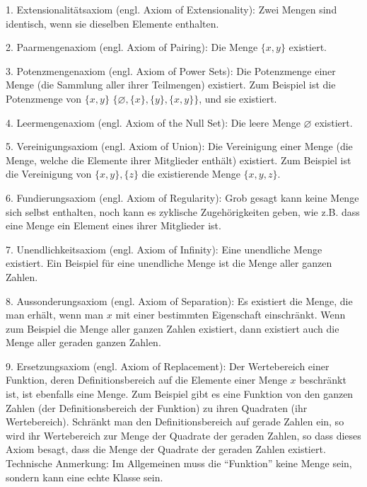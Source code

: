 1. Extensionalitätsaxiom (engl. Axiom of Extensionality):  Zwei Mengen sind identisch, wenn sie dieselben Elemente enthalten.

2. Paarmengenaxiom (engl. Axiom of Pairing):  Die Menge $\{ x , y \}$ existiert.

3. Potenzmengenaxiom (engl. Axiom of Power Sets):  Die Potenzmenge einer Menge (die Sammlung aller ihrer Teilmengen) existiert.  Zum Beispiel ist die Potenzmenge von $\{x,y\}$ $\{\varnothing,\{x\},\{y\},\{x,y\}\}$, und sie existiert.

4. Leermengenaxiom (engl. Axiom of the Null Set):  Die leere Menge $\varnothing$ existiert.

5. Vereinigungsaxiom (engl. Axiom of Union):  Die Vereinigung einer Menge (die Menge, welche die Elemente ihrer Mitglieder enthält) existiert.  Zum Beispiel ist die Vereinigung von $\{x,y\},\{z\}$ die existierende Menge $\{x,y,z\}$.

6. Fundierungsaxiom (engl. Axiom of Regularity):  Grob gesagt kann keine Menge sich selbst enthalten, noch kann es zyklische Zugehörigkeiten geben, wie z.B. dass eine Menge ein Element eines ihrer Mitglieder ist.

7. Unendlichkeitsaxiom (engl. Axiom of Infinity):  Eine unendliche Menge existiert.  Ein Beispiel für eine unendliche Menge ist die Menge aller ganzen Zahlen.

8. Aussonderungsaxiom (engl. Axiom of Separation):  Es existiert die Menge, die man erhält, wenn man $x$ mit einer bestimmten Eigenschaft einschränkt.  Wenn zum Beispiel die Menge aller ganzen Zahlen existiert, dann existiert auch die Menge aller geraden ganzen Zahlen.

9. Ersetzungsaxiom (engl. Axiom of Replacement):  Der Wertebereich einer Funktion, deren Definitionsbereich auf die Elemente einer Menge $x$ beschränkt ist, ist ebenfalls eine Menge.  Zum Beispiel gibt es eine Funktion von den ganzen Zahlen (der Definitionsbereich der Funktion) zu ihren Quadraten (ihr Wertebereich).  Schränkt man den Definitionsbereich auf gerade Zahlen ein, so wird ihr Wertebereich zur Menge der Quadrate der geraden Zahlen, so dass dieses Axiom besagt, dass die Menge der Quadrate der geraden Zahlen existiert.  Technische Anmerkung: Im Allgemeinen muss die "`Funktion"' keine Menge sein, sondern kann eine echte Klasse sein.

